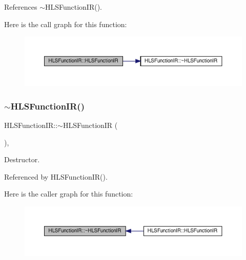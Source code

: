 References $\sim$\+H\+L\+S\+Function\+I\+R().

Here is the call graph for this function\+:
\nopagebreak
\begin{figure}[H]
\begin{center}
\leavevmode
\includegraphics[width=350pt]{da/df5/classHLSFunctionIR_ae001ab763fb04f3ff62c1f8ee8d0a06e_cgraph}
\end{center}
\end{figure}
\mbox{\label{classHLSFunctionIR_a9d593cf41a97dea0f5881362c77f5a38}} 
\subsubsection{\texorpdfstring{$\sim$\+H\+L\+S\+Function\+I\+R()}{~HLSFunctionIR()}}
{\footnotesize\ttfamily H\+L\+S\+Function\+I\+R\+::$\sim$\+H\+L\+S\+Function\+IR (\begin{DoxyParamCaption}{ }\end{DoxyParamCaption})\hspace{0.3cm}{\ttfamily [override]}, {\ttfamily [default]}}



Destructor. 



Referenced by H\+L\+S\+Function\+I\+R().

Here is the caller graph for this function\+:
\nopagebreak
\begin{figure}[H]
\begin{center}
\leavevmode
\includegraphics[width=350pt]{da/df5/classHLSFunctionIR_a9d593cf41a97dea0f5881362c77f5a38_icgraph}
\end{center}
\end{figure}


